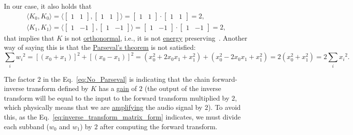In our case, it also holds that
\begin{equation}
\begin{array}{l}
  \langle K_0,K_0 \rangle =
  \langle \begin{bmatrix}
    1 & 1
  \end{bmatrix}
  ,
  \begin{bmatrix}
    1 & 1
  \end{bmatrix}
  \rangle =
  \begin{bmatrix}
    1 & 1
  \end{bmatrix}
  \cdot
  \begin{bmatrix}
    1 & 1
  \end{bmatrix}
   = 2,
   \\
     \langle K_1,K_1 \rangle =
  \langle \begin{bmatrix}
    1 & -1
  \end{bmatrix}
  ,
  \begin{bmatrix}
    1 & -1
  \end{bmatrix}
  \rangle =
  \begin{bmatrix}
    1 & -1
  \end{bmatrix}
  \cdot
  \begin{bmatrix}
    1 & -1
  \end{bmatrix}
   = 2,
   \end{array}
\end{equation}
that implies that $K$ is not
\href{https://en.wikipedia.org/wiki/Orthonormality}{orthonormal},
i.e., it is not
\href{https://en.wikipedia.org/wiki/Energy_(signal_processing)}{energy}
preserving~\cite{sayood2017introduction}. Another way of saying this
is that the \href{https://en.wikipedia.org/wiki/Parseval%27s_theorem}{Parseval's theorem}
  is not satisfied:
\begin{equation}
  \sum_i {w_i}^2 =
  \left[(x_0+x_1)\right]^2 + \left[(x_0-x_1)\right]^2 =
  (x_0^2+2x_0x_1+x_1^2) + (x_0^2-2x_0x_1+x_1^2) =
  2(x_0^2+x_1^2) =
  2\sum_i {x_i}^2.
  \label{eq:No_Parseval}
\end{equation}

The factor $2$ in the Eq.~\ref{eq:No_Parseval} is indicating that the
chain forward-inverse transform defined by $K$ has a
\href{https://en.wikipedia.org/wiki/Gain_(electronics)}{gain} of $2$
(the output of the inverse transform will be equal to the input to the
forward transform multiplied by $2$, which physically means that we
are \href{https://en.wikipedia.org/wiki/Amplifier}{amplifying} the
audio signal by $2$). To avoid this, as the
Eq.~\ref{eq:inverse_transform_matrix_form} indicates, we must divide
each subband ($w_0$ and $w_1$) by $2$ after computing the forward
transform.

